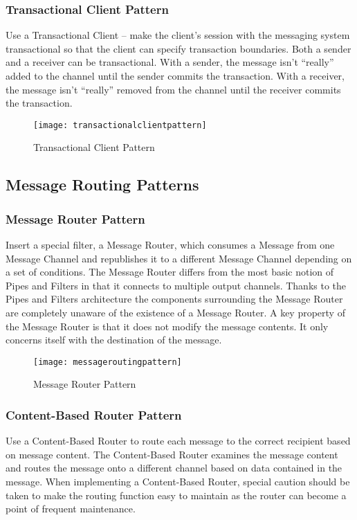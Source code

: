 \subsubsection{Transactional Client Pattern}
Use a Transactional Client – make the client’s session with the messaging system transactional so that the client can specify transaction boundaries. Both a sender and a receiver can be transactional. With a sender, the message isn’t “really” added to the channel until the sender commits the transaction. With a receiver, the message isn’t “really” removed from the channel until the receiver commits the transaction.

\begin{figure}[H]
  \center
  \texttt{[image: transactionalclientpattern]}
  \caption{Transactional Client Pattern}
\end{figure}

\pagebreak

\subsection{Message Routing Patterns}

\subsubsection{Message Router Pattern}
Insert a special filter, a Message Router, which consumes a Message from one Message Channel and republishes it to a different Message Channel depending on a set of conditions. The Message Router differs from the most basic notion of Pipes and Filters in that it connects to multiple output channels. Thanks to the Pipes and Filters architecture the components surrounding the Message Router are completely unaware of the existence of a Message Router. A key property of the Message Router is that it does not modify the message contents. It only concerns itself with the destination of the message.

\begin{figure}[H]
  \center
  \texttt{[image: messageroutingpattern]}
  \caption{Message Router Pattern}
\end{figure}

\subsubsection{Content-Based Router Pattern}
Use a Content-Based Router to route each message to the correct recipient based on message content. The Content-Based Router examines the message content and routes the message onto a different channel based on data contained in the message. When implementing a Content-Based Router, special caution should be taken to make the routing function easy to maintain as the router can become a point of frequent maintenance.

